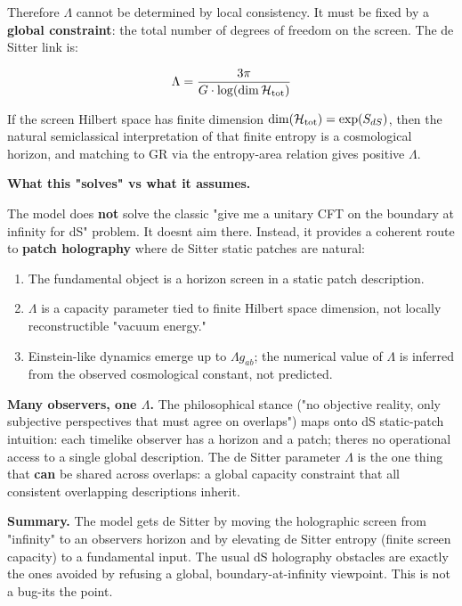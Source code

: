 Therefore \(\Lambda\) cannot be determined by local consistency. It must be fixed by a \textbf{global constraint}: the total number of degrees of freedom on the screen. The de Sitter link is:

\[
\Lambda = \frac{3\pi}{G \cdot \log(\dim \mathcal{H}_{\rm tot})}
\]

If the screen Hilbert space has finite dimension \(\dim(\mathcal{H}_{\rm tot})
= \exp(S_{dS})\), then the natural semiclassical interpretation of that finite entropy is a cosmological horizon, and matching to GR via the entropy-area relation gives positive \(\Lambda\).

\textbf{What this "solves" vs what it assumes.}

The model does \textbf{not} solve the classic "give me a unitary CFT on the boundary at infinity for dS" problem. It doesn\textquotesingle t aim there. Instead, it provides a coherent route to \textbf{patch holography} where de Sitter static patches are natural:

\begin{enumerate}
\def\labelenumi{\arabic{enumi}.}
\tightlist
\item
  The fundamental object is a horizon screen in a static patch description.
\item
  \(\Lambda\) is a capacity parameter tied to finite Hilbert space dimension, not locally reconstructible "vacuum energy."
\item
  Einstein-like dynamics emerge up to \(\Lambda g_{ab}\); the numerical value of \(\Lambda\) is inferred from the observed cosmological constant, not predicted.
\end{enumerate}

\textbf{Many observers, one \(\Lambda\).} The philosophical stance ("no objective reality, only subjective perspectives that must agree on overlaps") maps onto dS static-patch intuition: each timelike observer has a horizon and a patch; there\textquotesingle s no operational access to a single global description. The de Sitter parameter \(\Lambda\) is the one thing that \textbf{can} be shared across overlaps: a global capacity constraint that all consistent overlapping descriptions inherit.

\textbf{Summary.} The model gets de Sitter by moving the holographic screen from "infinity" to an observer\textquotesingle s horizon and by elevating de Sitter entropy (finite screen capacity) to a fundamental input. The usual dS holography obstacles are exactly the ones avoided by refusing a global, boundary-at-infinity viewpoint. This is not a bug-it\textquotesingle s the point.

